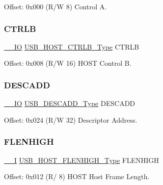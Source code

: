 Offset\+: 0x000 (R/W 8) Control A. 

\mbox{\label{struct_usb_host_abf548d767462ac8a8c067e067d688798}} 
\subsubsection{\texorpdfstring{CTRLB}{CTRLB}}
{\footnotesize\ttfamily \mbox{\hyperlink{core__cm0plus_8h_aec43007d9998a0a0e01faede4133d6be}{\+\_\+\+\_\+\+IO}} \mbox{\hyperlink{union_u_s_b___h_o_s_t___c_t_r_l_b___type}{U\+S\+B\+\_\+\+H\+O\+S\+T\+\_\+\+C\+T\+R\+L\+B\+\_\+\+Type}} C\+T\+R\+LB}



Offset\+: 0x008 (R/W 16) H\+O\+ST Control B. 

\mbox{\label{struct_usb_host_a4e4a634e8fbb0f0489872f7a9ee41bc4}} 
\subsubsection{\texorpdfstring{DESCADD}{DESCADD}}
{\footnotesize\ttfamily \mbox{\hyperlink{core__cm0plus_8h_aec43007d9998a0a0e01faede4133d6be}{\+\_\+\+\_\+\+IO}} \mbox{\hyperlink{union_u_s_b___d_e_s_c_a_d_d___type}{U\+S\+B\+\_\+\+D\+E\+S\+C\+A\+D\+D\+\_\+\+Type}} D\+E\+S\+C\+A\+DD}



Offset\+: 0x024 (R/W 32) Descriptor Address. 

\mbox{\label{struct_usb_host_a9804b2524fcb19f158a965f1e3856ba3}} 
\subsubsection{\texorpdfstring{FLENHIGH}{FLENHIGH}}
{\footnotesize\ttfamily \mbox{\hyperlink{core__cm0plus_8h_af63697ed9952cc71e1225efe205f6cd3}{\+\_\+\+\_\+I}} \mbox{\hyperlink{union_u_s_b___h_o_s_t___f_l_e_n_h_i_g_h___type}{U\+S\+B\+\_\+\+H\+O\+S\+T\+\_\+\+F\+L\+E\+N\+H\+I\+G\+H\+\_\+\+Type}} F\+L\+E\+N\+H\+I\+GH}



Offset\+: 0x012 (R/ 8) H\+O\+ST Host Frame Length. 


